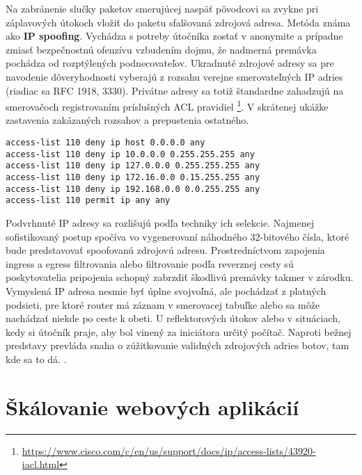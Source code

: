 \documentclass[12pt, a4paper]{article}
\begin{document}
Na zabránenie slučky paketov smerujúcej naspäť pôvodcovi sa zvykne pri záplavových útokoch vložiť do paketu 
sfalšovaná zdrojová adresa. Metóda známa ako \textbf{IP spoofing}. Vychádza s potreby útočníka zostať
v anonymite a prípadne zmiasť bezpečnostnú ofenzívu vzbudením dojmu, že nadmerná premávka pochádza od
rozptýlených podnecovateľov. Ukradnuté zdrojové adresy sa pre navodenie dôveryhodnosti vyberajú
z rozsahu verejne smerovateľných IP adries (riadiac sa RFC 1918, 3330). Privátne adresy sa totiž 
štandardne zahadzujú na smerovačoch registrovaním príslušných ACL pravidiel \footnote{\url{https://www.cisco.com/c/en/us/support/docs/ip/access-lists/43920-iacl.html}}. V skrátenej ukážke zastavenia 
zakázaných rozsahov a prepustenia ostatného. 
\begin{lstlisting}
access-list 110 deny ip host 0.0.0.0 any
access-list 110 deny ip 10.0.0.0 0.255.255.255 any
access-list 110 deny ip 127.0.0.0 0.255.255.255 any
access-list 110 deny ip 172.16.0.0 0.15.255.255 any
access-list 110 deny ip 192.168.0.0 0.0.255.255 any
access-list 110 permit ip any any
\end{lstlisting}

Podvrhnuté IP adresy sa rozlišujú podľa techniky ich selekcie. Najmenej sofistikovaný postup spočíva vo 
vygenerovaní náhodného 32-bitového čísla, ktoré bude predstavovať spoofovanú zdrojovú adresu. 
Prostredníctvom zapojenia ingress a egress filtrovania alebo filtrovanie podľa reverznej cesty sú
poskytovatelia pripojenia schopný zabrzdiť škodlivú premávky takmer v zárodku. Vymyslená IP adresa nesmie 
byť úplne svojvoľná, ale pochádzať z platných podsieti, pre ktoré router má záznam v smerovacej tabuľke 
alebo sa môže nachádzať niekde po ceste k obeti. U reflektorových útokov alebo v situáciach, kedy si
útočník praje, aby bol vinený za iniciátora určitý počítač. Naproti bežnej predstavy prevláda snaha
o zúžitkovanie validných zdrojových adries botov, tam kde sa to dá. \cite{ddos-anatomy-2004}.



\newpage

\section{Škálovanie webových aplikácií}
\end{document}
